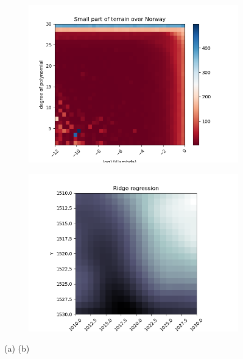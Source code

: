 \documentclass[../main.tex]{subfiles}
\begin{document}
\begin{figure}[htb] 
   \centering
   \begin{subfigure}[b]{0.45\textwidth}
    \centering
    \includegraphics[width=\textwidth]{../assets/terrain-ridge-degree-lambda-colormap.png} 
    \caption{}
    
   \end{subfigure}
   \quad
   \begin{subfigure}[b]{0.45\textwidth}
    \centering
    \includegraphics[width=\textwidth]{../assets/Terrain_ridge_bestdegree.png} 
    \caption{}
   \end{subfigure}
   \caption{(a) (b) 
   }
   \label{fig:terrain-ridge}
\end{figure} 
\end{document}
